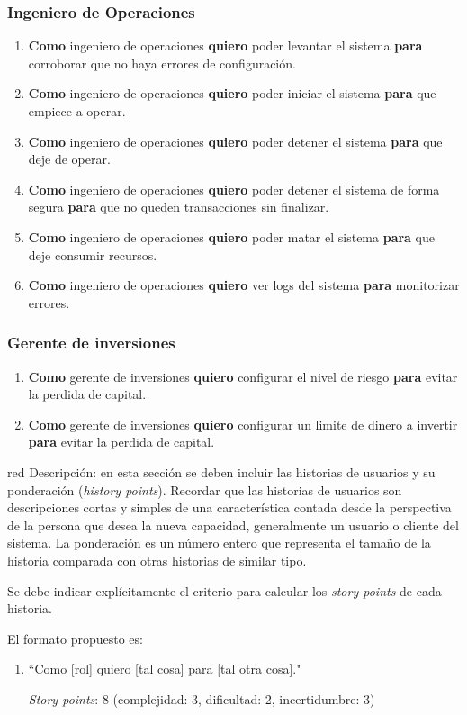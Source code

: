\documentclass[
    11pt, %
]{charter}
\begin{document}
    \subsubsection{Ingeniero de Operaciones}
    \begin{enumerate}
    \item \textbf{Como} ingeniero de operaciones \textbf{quiero} poder levantar el sistema \textbf{para} corroborar que no haya errores de configuración.
    \item \textbf{Como} ingeniero de operaciones \textbf{quiero} poder iniciar el sistema \textbf{para} que empiece a operar.
    \item \textbf{Como} ingeniero de operaciones \textbf{quiero} poder detener el sistema \textbf{para} que deje de operar.
    \item \textbf{Como} ingeniero de operaciones \textbf{quiero} poder detener el sistema de forma segura \textbf{para} que no queden transacciones sin finalizar.
    \item \textbf{Como} ingeniero de operaciones \textbf{quiero} poder matar el sistema \textbf{para} que deje consumir recursos.
    \item \textbf{Como} ingeniero de operaciones \textbf{quiero} ver logs del sistema  \textbf{para} monitorizar errores.
    \end{enumerate}

    \subsubsection{Gerente de inversiones}
    \begin{enumerate}
    \item \textbf{Como} gerente de inversiones  \textbf{quiero} configurar el nivel de riesgo \textbf{para} evitar la perdida de capital.
    \item \textbf{Como} gerente de inversiones  \textbf{quiero} configurar un limite de dinero a invertir \textbf{para} evitar la perdida de capital.
    \end{enumerate}

    \begin{consigna}{red}
        Descripción: en esta sección se deben incluir las historias de usuarios y su ponderación (\textit{history points}). Recordar que las historias de usuarios son descripciones cortas y simples de una característica contada desde la perspectiva de la persona que desea la nueva capacidad, generalmente un usuario o cliente del sistema. La ponderación es un número entero que representa el tamaño de la historia comparada con otras historias de similar tipo.

        Se debe indicar explícitamente el criterio para calcular los \textit{story points} de cada historia.

        El formato propuesto es:
        \begin{enumerate}
            \item ``Como [rol] quiero [tal cosa] para [tal otra cosa]."

            \textit{Story points}: 8 (complejidad: 3, dificultad: 2, incertidumbre: 3)
        \end{enumerate}
    \end{consigna}
\end{document}
